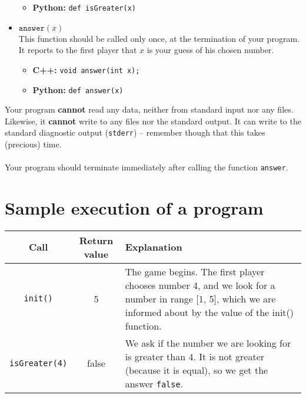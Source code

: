 \documentclass[zad,zawodnik,utf8,en]{sinol}
\begin{document}
\begin{tasktext}
\begin{itemize}
\begin{itemize}
                \item \textbf{Python:}
		                \texttt{def isGreater(x)}
            \end{itemize}

        \item $\texttt{answer}(x)$ \\
            This function should be called only once,
            at the termination of your program.
            It reports to the first player that $x$
            is your guess of his chosen number.
            \begin{itemize}
                \item \textbf{C++:}
		                \texttt{void answer(int x);}
                \item \textbf{Python:}
		                \texttt{def answer(x)}
            \end{itemize}
    \end{itemize}

    \noindent Your program \textbf{cannot} read any data,
    neither from standard input nor any files.
    Likewise, it \textbf{cannot} write to any files nor the standard output.
    It can write to the standard diagnostic output (\texttt{stderr}) -- remember
    though that this takes (precious) time.\\
    \\
    Your program should terminate immediately
    after calling the function \texttt{answer}.


\section{Sample execution of a program}

    \begin{tabular}{|c|c|p{12.5cm}|}
        \hline

        \textbf{Call} & \textbf{Return value} & \textbf{Explanation} \\ \hline

        \texttt{init()} & 5 &
        The game begins. The first player chooses number 4,
        and we look for a number in range [1, 5],
        which we are informed about by the value of the init() function.
        \\ \hline

        \texttt{isGreater(4)} & false &
        We ask if the number we are looking for is greater than 4.
        It is not greater (because it is equal),
        so we get the answer \texttt{false}.  
        \\ \hline


\end{tabular}
\end{tasktext}
\end{document}
